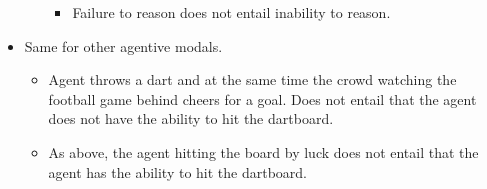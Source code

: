 \documentclass[10pt]{article}
\begin{document}
\begin{itemize}
\begin{itemize}
        \begin{itemize}
    \item Failure to reason does not entail inability to reason.
    \end{itemize}
  \end{itemize}
\item Same for other agentive modals.
  \begin{itemize}
  \item Agent throws a dart and at the same time the crowd watching the football game behind cheers for a goal.
    Does not entail that the agent does not have the ability to hit the dartboard.
  \item As above, the agent hitting the board by luck does not entail that the agent has the ability to hit the dartboard.
  \end{itemize}
\end{itemize}
\end{document}

